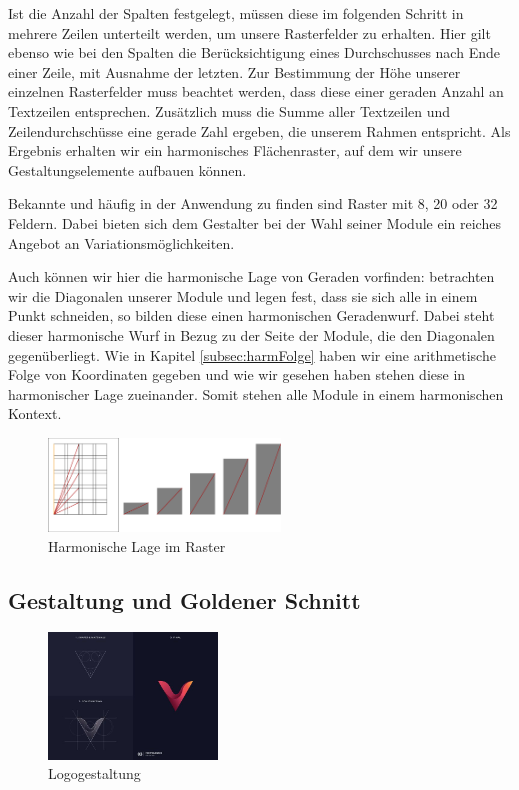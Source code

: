 \documentclass[12pt,a4paper]{article}
\begin{document}
Ist die Anzahl der Spalten festgelegt, müssen diese im folgenden Schritt in mehrere Zeilen unterteilt werden, um unsere Rasterfelder zu erhalten. Hier gilt ebenso wie bei den Spalten die Berücksichtigung eines Durchschusses nach Ende einer Zeile, mit Ausnahme der letzten. Zur Bestimmung der Höhe unserer einzelnen Rasterfelder muss beachtet werden, dass diese einer geraden Anzahl an Textzeilen entsprechen. Zusätzlich muss die Summe aller Textzeilen und Zeilendurchschüsse eine gerade Zahl ergeben, die unserem Rahmen entspricht. Als Ergebnis erhalten wir ein harmonisches Flächenraster, auf dem wir unsere Gestaltungselemente aufbauen können.

Bekannte und häufig in der Anwendung zu finden sind Raster mit 8, 20 oder 32 Feldern.  Dabei bieten sich dem Gestalter bei der Wahl seiner Module ein reiches Angebot an Variationsmöglichkeiten.

Auch können wir hier die harmonische Lage von Geraden vorfinden: betrachten wir die Diagonalen unserer Module und legen fest, dass sie sich alle in einem Punkt schneiden, so bilden diese einen harmonischen Geradenwurf. Dabei steht dieser harmonische Wurf in Bezug zu der Seite der Module, die den Diagonalen gegenüberliegt. Wie in Kapitel \ref{subsec:harmFolge} haben wir eine arithmetische Folge von Koordinaten gegeben und wie wir gesehen haben stehen diese in harmonischer Lage zueinander. Somit stehen alle Module in einem harmonischen Kontext.

\begin{figure}[htbp]
\centering
\includegraphics[width=0.55\textwidth]{Bilder/raster.png}
\caption{Harmonische Lage im Raster}
\label{fig:raster}
\end{figure}

\newpage
\subsection{Gestaltung und Goldener Schnitt}

\begin{figure}
\includegraphics[width=0.4\textwidth]{Bilder/gr_logo.jpg} %
\caption{Logogestaltung\protect\footnotemark[8]}
\end{figure}
\end{document}
